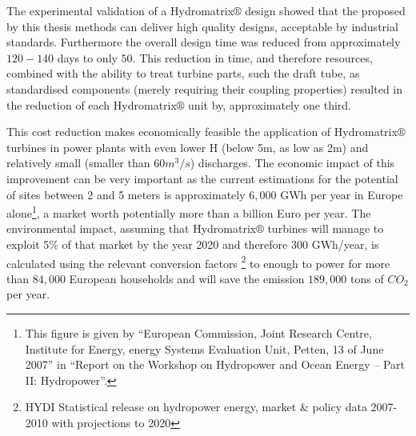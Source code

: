 The experimental validation of a Hydromatrix$\circledR$ design showed that the proposed by this thesis methods can deliver high quality designs, acceptable by industrial standards. Furthermore the overall design time was reduced from approximately $120-140$ days to only $50$. This reduction in time, and therefore resources, combined with the ability to treat turbine parts, such the draft tube, as standardised components (merely requiring their coupling properties) resulted in the reduction of each Hydromatrix$\circledR$ unit by, approximately  one third.

This cost reduction makes economically feasible the application of Hydromatrix$\circledR$ turbines in power plants with even lower H (below 5m, as low as 2m)  and relatively small (smaller than $60m^3/s$) discharges. The economic impact of this improvement can be very important as the current estimations for the potential of sites between 2 and 5 meters is approximately $6,000$ GWh
per year in Europe alone\footnote{This figure is given by ``European Commission, Joint Research Centre, Institute for Energy, energy Systems Evaluation Unit,  Petten, 13 of June 2007'' in  ``Report on the Workshop on Hydropower and Ocean Energy – Part II: Hydropower''.}, a market worth potentially more than a billion Euro per year. The environmental impact, assuming that Hydromatrix$\circledR$ turbines will manage to exploit 5\% of that market by the year 2020 and therefore $300$ GWh/year, is calculated using the relevant conversion factors \footnote{HYDI Statistical release on hydropower energy, market \& policy data 2007-2010 with projections to 2020} to enough to power for more than $84,000$ European households and will save the emission $189,000$ tons of $CO_2$ per year.

  

 





 







 






